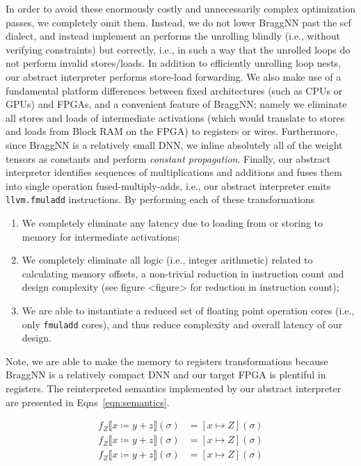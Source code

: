In order to avoid these enormously costly and unnecessarily complex optimization passes, we completely omit them.
Instead, we do not lower BraggNN past the scf dialect, and instead implement an performs the unrolling blindly (i.e., without verifying constraints) but correctly, i.e., in such a way that the unrolled loops do not perform invalid stores/loads.
In addition to efficiently unrolling loop nests, our abstract interpreter performs store-load forwarding.
We also make use of a fundamental platform differences between fixed architectures (such as CPUs or GPUs) and FPGAs, and a convenient feature of BraggNN;
namely we eliminate all stores and loads of intermediate activations (which would translate to stores and loads from Block RAM on the FPGA) to registers or wires.
Furthermore, since BraggNN is a relatively small DNN, we inline absolutely all of the weight tensors as constants and perform \emph{constant propagation}.
Finally, our abstract interpreter identifies sequences of multiplications and additions and fuses them into single operation fused-multiply-adds, i.e., our abstract interpreter emits \texttt{llvm.fmuladd} instructions.
By performing each of these transformations
\begin{enumerate}
	\item We completely eliminate any latency due to loading from or storing to memory for intermediate activations;
	\item We completely eliminate all logic (i.e., integer arithmetic) related to calculating memory offsets, a non-trivial reduction in instruction count and design complexity (see figure <figure> for reduction in instruction count);
	\item We are able to instantiate a reduced set of floating point operation cores (i.e., only \texttt{fmuladd} cores), and thus reduce complexity and overall latency of our design.
\end{enumerate}
Note, we are able to make the memory to registers transformations because BraggNN is a relatively compact DNN and our target FPGA is plentiful in registers.
The reinterpreted semantics implemented by our abstract interpreter are presented in Eqns~\eqref{eqn:semantics}.

\begin{equation}\label{eqn:semantics}
\begin{split}
	f_{Z} \llbracket x \coloneqq y + z\rrbracket (\sigma) &= [ x \mapsto Z ] (\sigma) \\
	f_{Z} \llbracket x \coloneqq y + z\rrbracket (\sigma) &= [ x \mapsto Z ] (\sigma) \\
	f_{Z} \llbracket x \coloneqq y + z\rrbracket (\sigma) &= [ x \mapsto Z ] (\sigma) \\
\end{split}
\end{equation}

